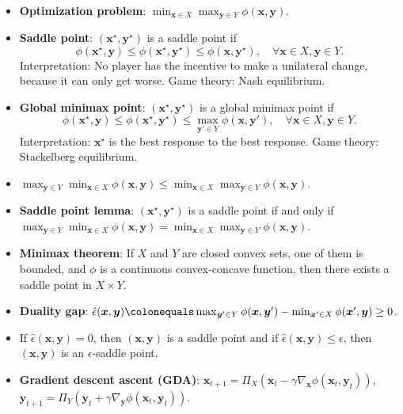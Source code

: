 \documentclass[8pt,a4paper]{extarticle}
\renewcommand{\vec}[1]{\bm{#1}}
\newenvironment{topic}[1]
{\textbf{\sffamily \colorbox{black}{\rlap{\textbf{\textcolor{white}{#1}}}\hspace{\linewidth}\hspace{-2\fboxsep}}} \\ \vspace{0.2cm}}
{}
\begin{document}
\begin{multicols*}{2}
    \begin{topic}{Min-max optimization}
        \begin{itemize}
            \item \textbf{Optimization problem}: $\min_{\vec{x} \in X} \max_{\vec{y} \in Y} \phi(\vec{x}, \vec{y})$.
            \item \textbf{Saddle point}: $(\vec{x}^\star, \vec{y}^\star)$ is a saddle point if \[
                      \phi(\vec{x}^\star, \vec{y}) \leq \phi(\vec{x}^\star, \vec{y}^\star) \leq \phi(\vec{x}, \vec{y}^\star), \quad \forall \vec{x} \in X, \vec{y} \in Y.
                  \]
                  Interpretation: No player has the incentive to make a unilateral change, because it can only get
                  worse. Game theory: Nash equilibrium.
            \item \textbf{Global minimax point}: $(\vec{x}^\star, \vec{y}^\star)$ is a global minimax point if \[
                      \phi(\vec{x}^\star, \vec{y}) \leq \phi(\vec{x}^\star, \vec{y}^\star) \leq \max_{\vec{y}' \in Y} \phi(\vec{x}, \vec{y}'), \quad \forall \vec{x} \in X, \vec{y} \in Y.
                  \]
                  Interpretation: $\vec{x}^\star$ is the best response to the best response. Game theory: Stackelberg
                  equilibrium.
            \item $\max_{\vec{y} \in Y} \min_{\vec{x} \in X} \phi(\vec{x}, \vec{y}) \leq \min_{\vec{x} \in X} \max_{\vec{y} \in Y} \phi(\vec{x}, \vec{y})$.
            \item \textbf{Saddle point lemma}: $(\vec{x}^\star, \vec{y}^\star)$ is a saddle point if and only if $\max_{\vec{y} \in Y} \min_{\vec{x} \in X} \phi(\vec{x}, \vec{y}) = \min_{\vec{x} \in X} \max_{\vec{y} \in Y} \phi(\vec{x}, \vec{y})$.
            \item \textbf{Minimax theorem}: If $X$ and $Y$ are closed convex sets, one of them is bounded, and $\phi$ is a continuous convex-concave function, then there exists a saddle point in $X \times Y$.
            \item \textbf{Duality gap}: $\hat{\epsilon}(\vec{x}, \vec{y}) \colonequals \max_{\vec{y}' \in Y} \phi(\vec{x}, \vec{y}') - \min_{\vec{x}' \in X} \phi(\vec{x}', \vec{y}) \geq 0$.
            \item If $\hat{\epsilon}(\vec{x}, \vec{y}) = 0$, then $(\vec{x}, \vec{y})$ is a saddle point and if
                  $\hat{\epsilon}(\vec{x}, \vec{y}) \leq \epsilon$, then $(\vec{x}, \vec{y})$ is an $\epsilon$-saddle
                  point.
            \item \textbf{Gradient descent ascent (GDA)}: $\vec{x}_{t+1} = \Pi_X(\vec{x}_t - \gamma \nabla_{\vec{x}} \phi(\vec{x}_t, \vec{y}_t))$, $\vec{y}_{t+1} = \Pi_Y(\vec{y}_t + \gamma \nabla_{\vec{y}} \phi(\vec{x}_t, \vec{y}_t))$. \\

\end{itemize}
\end{topic}
\end{multicols*}
\end{document}
